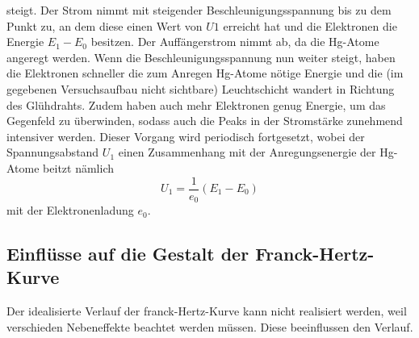 steigt. Der Strom nimmt mit steigender Beschleunigungsspannung bis zu dem Punkt zu, an dem diese einen Wert von $U1$ erreicht hat und die 
Elektronen die Energie $E_1 − E_0$ besitzen. Der Auffängerstrom nimmt ab, da die Hg-Atome angeregt werden. 
Wenn die Beschleunigungsspannung nun weiter steigt, haben die Elektronen schneller
die zum Anregen Hg-Atome nötige Energie und die (im gegebenen Versuchsaufbau nicht
sichtbare) Leuchtschicht wandert in Richtung des Glühdrahts. Zudem haben auch mehr
Elektronen genug Energie, um das Gegenfeld zu überwinden, sodass auch die Peaks in
der Stromstärke zunehmend intensiver werden.
Dieser Vorgang wird periodisch fortgesetzt, wobei der Spannungsabstand $U_1$ einen Zusammenhang  mit der Anregungsenergie der Hg-Atome beitzt nämlich
\begin{equation}
    U_1 = \frac{1}{e_0} (E_1 - E_0)
\end{equation}
mit der Elektronenladung $e_0$.

\subsection{Einflüsse auf die Gestalt der Franck-Hertz-Kurve}
\label{subsec:Franck-Hertz-Kurve}
Der idealisierte Verlauf der franck-Hertz-Kurve kann nicht realisiert werden, weil verschieden Nebeneffekte beachtet werden müssen.
Diese beeinflussen den Verlauf.

